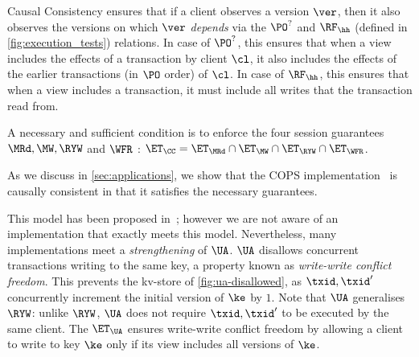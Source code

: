 

Causal Consistency ensures that if a client observes a version $\ver$, 
then it also observes the versions on which $\ver$ \emph{depends} \cite{cops} via the
$\PO^?$  and $\RF_{\hh}$ (defined in \cref{fig:execution_tests}) relations.
In case of $\PO^?$, this ensures that when a view includes the effects of a transaction by client $\cl$, 
it also includes the effects of the earlier transactions (in $\PO$ order) of $\cl$. 
In case of $\RF_{\hh}$, this ensures that when a view includes a transaction,
it must include all writes that the transaction read from.



A necessary and sufficient condition is to enforce the four session
guarantees $\MRd, \MW, \RYW$ and $\WFR$ \cite{session2causal}:
$\ET_{\CC} = \ET_{\MRd} \cap \ET_{\MW} \cap \ET_{\RYW} \cap
\ET_{\WFR}$.


  
As we discuss in \cref{sec:applications}, we show that the COPS implementation~\cite{cops} is causally consistent in that it satisfies the necessary guarantees. 

This model has been proposed in~\cite{framework-concur};
however we are not aware of an implementation that exactly meets  this model.
Nevertheless, many implementations meet a
\emph{strengthening} of $\UA$.
$\UA$ disallows concurrent transactions writing to the same key,
a property known as \emph{write-write conflict freedom}.
This prevents the kv-store of \cref{fig:ua-disallowed},
as $\txid, \txid'$ concurrently increment the initial version of $\ke$ by $1$.
Note that $\UA$ generalises $\RYW$: unlike $\RYW$, $\UA$ does not require $\txid, \txid'$ to be executed by the same client.
The  $\ET_\UA$ ensures write-write conflict freedom by allowing a client to write to key $\ke$
only if its view includes all versions of $\ke$.

